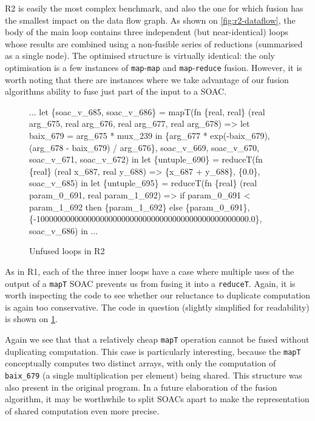 R2 is easily the most complex benchmark, and also the one for which
fusion has the smallest impact on the data flow graph.  As shown on
\cref{fig:r2-dataflow}, the body of the main loop contains three
independent (but near-identical) loops whose results are combined
using a non-fusible series of reductions (summarised as a single
node).  The optimised structure is virtually identical: the only
optimisation is a few instances of \texttt{map}-\texttt{map} and
\texttt{map}-\texttt{reduce} fusion.  However, it is worth noting that
there are instances where we take advantage of our fusion algorithms
ability to fuse just part of the input to a SOAC.

\begin{figure}
\begin{center}
\begin{bcolorcode}
...
let \{soac_v_685, soac_v_686\} =
  mapT(fn \{real, real\} (real arg_675, real arg_676, real arg_677, real arg_678) =>
         let baix_679 = arg_675 * mux_239 in
         \{arg_677 * exp(-baix_679),
           (arg_678 - baix_679) / arg_676\},
       soac_v_669, soac_v_670, soac_v_671, soac_v_672) in
let \{untuple_690\} =
  reduceT(fn \{real\} (real x_687, real y_688) =>
            \{x_687 + y_688\},
          \{0.0\}, soac_v_685) in
let \{untuple_695\} =
  reduceT(fn \{real\} (real param_0_691, real param_1_692) =>
            if param_0_691 < param_1_692
            then \{param_1_692\}
            else \{param_0_691\},
          \{-10000000000000000000000000000000000000000000000000.0\},
          soac_v_686) in
...
\end{bcolorcode}
\end{center}
\caption{Unfused loops in R2}
\label{fig:r2-unfused-loops}
\end{figure}

As in R1, each of the three inner loops have a case where multiple
uses of the output of a \texttt{mapT} SOAC prevents us from fusing it
into a \texttt{reduceT}.  Again, it is worth inspecting the code to
see whether our reluctance to duplicate computation is again too
conservative.  The code in question (slightly simplified for
readability) is shown on \cref{fig:r2-unfused-loops}.

Again we see that that a relatively cheap \texttt{mapT} operation
cannot be fused without duplicating computation.  This case is
particularly interesting, because the \texttt{mapT} conceptually
computes two distinct arrays, with only the computation of
\texttt{baix\_679} (a single multiplication per element) being shared.
This structure was also present in the original program.  In a future
elaboration of the fusion algorithm, it may be worthwhile to split
SOACs apart to make the representation of shared computation even more
precise.

